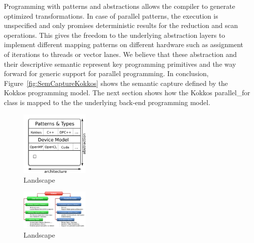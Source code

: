 Programming with patterns and abstractions allows the compiler to generate optimized transformations. In case of parallel patterns, the execution is unspecified and only promises deterministic results for the reduction and scan operations. This gives the freedom to the underlying abstraction layers to implement different mapping patterns on different hardware such as assignment of iterations to threads or vector lanes. We believe that these abstraction and their descriptive semantic represent key programming primitives and the way forward for generic support for parallel programming. In conclusion, Figure~\ref{fig:SemCaptureKokkos} shows the semantic capture defined by the Kokkos programming model. 
The next section shows how the Kokkos parallel\_for class is mapped to the the underlying back-end programming model.

\begin{figure}
\centerline{\includegraphics[width=0.3\textwidth]{img/Stack.png}}
\caption{Landscape}
\label{fig:stack}
\end{figure}

\begin{figure}
\centerline{\includegraphics[width=0.3\textwidth]{img/Abstractions.png}}
\caption{Landscape}
\label{fig:abstractions}
\end{figure}


